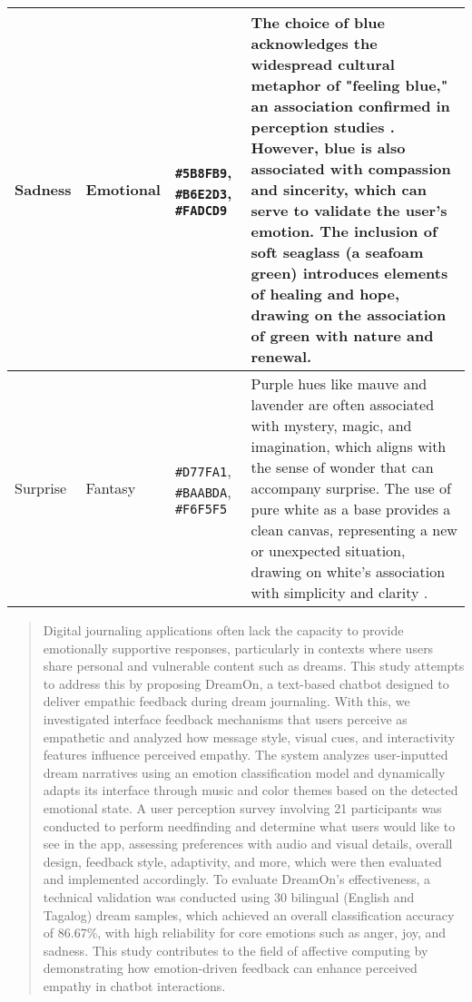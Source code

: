 \documentclass[conference]{IEEEtran}
\begin{document}
\begin{table*}[t]
\begin{tabular}{|p{}|p{}|p{}|p{}|}
			\hline
			Sadness & Emotional & \cellcolor{sadnessPrimary}\texttt{\#5B8FB9}, \cellcolor{sadnessSecondary}\texttt{\#B6E2D3}, \cellcolor{sadnessAccent}\texttt{\#FADCD9} & The choice of blue acknowledges the widespread cultural metaphor of "feeling blue," an association confirmed in perception studies \cite{b7}. However, blue is also associated with compassion and sincerity, which can serve to validate the user's emotion. The inclusion of soft seaglass (a seafoam green) introduces elements of healing and hope, drawing on the association of green with nature and renewal. \\
			\hline
			Surprise & Fantasy & \cellcolor{surprisePrimary}\texttt{\#D77FA1}, \cellcolor{surpriseSecondary}\texttt{\#BAABDA}, \cellcolor{surpriseAccent}\texttt{\#F6F5F5} & Purple hues like mauve and lavender are often associated with mystery, magic, and imagination, which aligns with the sense of wonder that can accompany surprise. The use of pure white as a base provides a clean canvas, representing a new or unexpected situation, drawing on white's association with simplicity and clarity \cite{b6}. \\
			\hline
		\end{tabular}
	\end{table*}
	
	\begin{abstract}
		Digital journaling applications often lack the capacity to provide emotionally supportive responses, particularly in contexts where users share personal and vulnerable content such as dreams. This study attempts to address this by proposing DreamOn, a text-based chatbot designed to deliver empathic feedback during dream journaling. With this, we investigated interface feedback mechanisms that users perceive as empathetic and analyzed how message style, visual cues, and interactivity features influence perceived empathy. The system analyzes user-inputted dream narratives using an emotion classification model and dynamically adapts its interface through music and color themes based on the detected emotional state. A user perception survey involving 21 participants was conducted to perform needfinding and determine what users would like to see in the app, assessing preferences with audio and visual details, overall design, feedback style, adaptivity, and more, which were then evaluated and implemented accordingly. To evaluate DreamOn’s effectiveness, a technical validation was conducted using 30 bilingual (English and Tagalog) dream samples, which achieved an overall classification accuracy of 86.67\%, with high reliability for core emotions such as anger, joy, and sadness. This study contributes to the field of affective computing by demonstrating how emotion-driven feedback can enhance perceived empathy in chatbot interactions. 

	\end{abstract}
	
\end{document}
